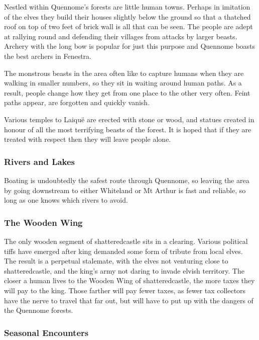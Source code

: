 \begin{multicols}{2}
Nestled within Quennome's forests are little human towns.
Perhaps in imitation of the elves they build their houses slightly below the ground so that a thatched roof on top of two feet of brick wall is all that can be seen.
The people are adept at rallying round and defending their villages from attacks by larger beasts.
Archery with the long bow is popular for just this purpose and Quennome boasts the best archers in Fenestra.

The monstrous beasts in the area often like to capture humans when they are walking in smaller numbers, so they sit in waiting around human paths.
As a result, people change how they get from one place to the other very often.
Feint paths appear, are forgotten and quickly vanish.

Various temples to Laiqu\"{e} are erected with stone or wood, and statues created in honour of all the most terrifying beasts of the forest.  It is hoped that if they are treated with respect then they will leave people alone.

\subsubsection{Rivers and Lakes}

Boating is undoubtedly the safest route through Quennome, so leaving the area by going downstream to either Whiteland or Mt Arthur is fast and reliable, so long as one knows which rivers to avoid.

\subsubsection{The Wooden Wing}

The only wooden segment of \gls{shatteredcastle} sits in a clearing.
Various political tiffs have emerged after \gls{king} demanded some form of tribute from local elves.
The result is a perpetual stalemate, with the elves not venturing close to \gls{shatteredcastle}, and the king's army not daring to invade elvish territory.
The closer a human lives to the Wooden Wing of \gls{shatteredcastle}, the more taxes they will pay to the king.
Those farther will pay fewer taxes, as fewer tax collectors have the nerve to travel that far out, but will have to put up with the dangers of the Quennome forests.

\subsubsection{Seasonal Encounters}


\end{multicols}
